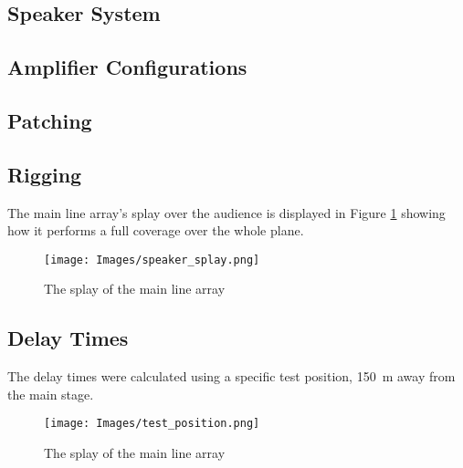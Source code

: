 \documentclass{BCUReport}
\begin{document}


\clearpage



\newpage
{}

\begin{appendices}
    \section{Speaker System} 
    
        \subsection{Amplifier Configurations}
            \label{appendix:speaker_amp_config}
            
    
        \subsection{Patching}
            \label{appendix:speaker_patch}
            
        
        \subsection{Rigging}
            The main line array's splay over the audience is displayed in Figure \ref{fig:speaker_splay} showing how it performs a full coverage over the whole plane.
    
            \begin{figure}[H]
                \centering
                \texttt{[image: Images/speaker\_splay.png]}
                \caption{The splay of the main line array}
                \label{fig:speaker_splay}
            \end{figure}
            
            \label{appendix:speaker_rigging}
            
        
        \subsection{Delay Times}
        The delay times were calculated using a specific test position, \SI{150}{\metre} away from the main stage.
        \begin{figure}[H]
            \centering
            \texttt{[image: Images/test\_position.png]}
            \caption{The splay of the main line array}
            \label{fig:speaker_test_pos}
        \end{figure}
        

\end{appendices}
\end{document}

